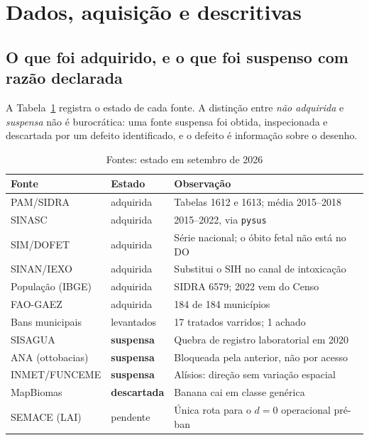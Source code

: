 %
%

\section{Dados, aquisição e descritivas}
\label{sec:dados}

\subsection{O que foi adquirido, e o que foi suspenso com razão declarada}
\label{sub:aquisicao}

A Tabela~\ref{tab:fontes} registra o estado de cada fonte. A distinção entre
\emph{não adquirida} e \emph{suspensa} não é burocrática: uma fonte suspensa foi
obtida, inspecionada e descartada por um defeito identificado, e o defeito é
informação sobre o desenho.

\begin{table}[htbp]
\centering
\caption{Fontes: estado em setembro de 2026}
\label{tab:fontes}
\small
\begin{tabular}{llp{7.2cm}}
\toprule
\textbf{Fonte} & \textbf{Estado} & \textbf{Observação} \\
\midrule
PAM/SIDRA        & adquirida & Tabelas 1612 e 1613; média 2015--2018 \\
SINASC           & adquirida & 2015--2022, via \texttt{pysus} \\
SIM/DOFET        & adquirida & Série nacional; o óbito fetal não está no DO \\
SINAN/IEXO       & adquirida & Substitui o SIH no canal de intoxicação \\
População (IBGE) & adquirida & SIDRA 6579; 2022 vem do Censo \\
FAO-GAEZ         & adquirida & 184 de 184 municípios \\
Bans municipais  & levantados & 17 tratados varridos; 1 achado \\
\midrule
SISAGUA          & \textbf{suspensa} & Quebra de registro laboratorial em 2020 \\
ANA (ottobacias) & \textbf{suspensa} & Bloqueada pela anterior, não por acesso \\
INMET/FUNCEME    & \textbf{suspensa} & Alísios: direção sem variação espacial \\
MapBiomas        & \textbf{descartada} & Banana cai em classe genérica \\
SEMACE (LAI)     & pendente & Única rota para o \(d=0\) operacional pré-ban \\
\bottomrule
\end{tabular}
\end{table}

